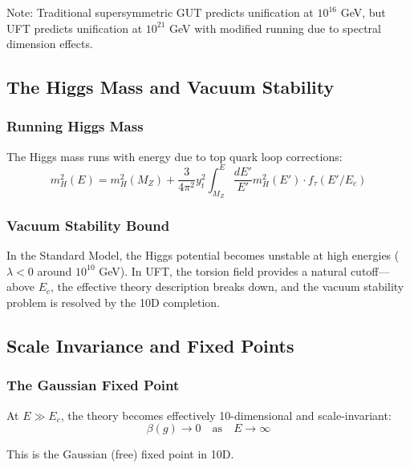 Note: Traditional supersymmetric GUT predicts unification at $10^{16}$ GeV, but UFT predicts unification at $10^{21}$ GeV with modified running due to spectral dimension effects.

\subsection{The Higgs Mass and Vacuum Stability}

\subsubsection{Running Higgs Mass}

The Higgs mass runs with energy due to top quark loop corrections:
\begin{equation}
    m_H^2(E) = m_H^2(M_Z) + \frac{3}{4\pi^2} y_t^2 \int_{M_Z}^E \frac{dE'}{E'} m_H^2(E') \cdot f_\tau(E'/E_c)
\end{equation}

\subsubsection{Vacuum Stability Bound}

\begin{insight}
In the Standard Model, the Higgs potential becomes unstable at high energies ($\lambda < 0$ around $10^{10}$ GeV). In UFT, the torsion field provides a natural cutoff—above $E_c$, the effective theory description breaks down, and the vacuum stability problem is resolved by the 10D completion.
\end{insight}

\subsection{Scale Invariance and Fixed Points}

\subsubsection{The Gaussian Fixed Point}

At $E \gg E_c$, the theory becomes effectively 10-dimensional and scale-invariant:
\begin{equation}
    \beta(g) \to 0 \quad \text{as} \quad E \to \infty
\end{equation}

This is the Gaussian (free) fixed point in 10D.

